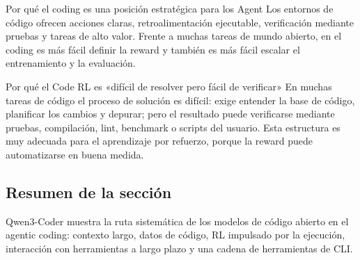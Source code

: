 \begin{importantbox}{Por qué el coding es una posición estratégica para los Agent}
Los entornos de código ofrecen acciones claras, retroalimentación ejecutable, verificación mediante pruebas y tareas de alto valor. Frente a muchas tareas de mundo abierto, en el coding es más fácil definir la reward y también es más fácil escalar el entrenamiento y la evaluación.
\end{importantbox}

\begin{knowledgebox}{Por qué el Code RL es «difícil de resolver pero fácil de verificar»}
En muchas tareas de código el proceso de solución es difícil: exige entender la base de código, planificar los cambios y depurar; pero el resultado puede verificarse mediante pruebas, compilación, lint, benchmark o scripts del usuario. Esta estructura es muy adecuada para el aprendizaje por refuerzo, porque la reward puede automatizarse en buena medida.
\end{knowledgebox}

\subsection{Resumen de la sección}

Qwen3-Coder muestra la ruta sistemática de los modelos de código abierto en el agentic coding: contexto largo, datos de código, RL impulsado por la ejecución, interacción con herramientas a largo plazo y una cadena de herramientas de CLI.
